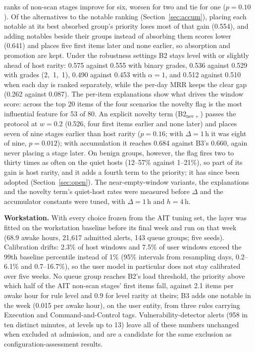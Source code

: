 \documentclass[conference]{IEEEtran}
\begin{document}
ranks of non-scan stages improve for six, worsen for two and tie for one ($p = 0.10$). Of the alternatives to the notable ranking (Section~\ref{sec:accum}), placing each notable at its best absorbed group's priority loses most of that gain (0.554), and adding notables beside their groups instead of absorbing them scores lower (0.641) and places five first items later and none earlier, so absorption and promotion are kept. Under the robustness settings B2 stays level with or slightly ahead of host rarity: 0.575 against 0.555 with binary grades, 0.536 against 0.529 with grades (2,~1,~1), 0.490 against 0.453 with $\alpha = 1$, and 0.512 against 0.510 when each day is ranked separately, while the per-day MRR keeps the clear gap (0.262 against 0.087). The per-item explanations show what drives the window score: across the top 20 items of the four scenarios the novelty flag is the most influential feature for 53 of 80. An explicit novelty term (B2$_\mathrm{nov+}$) passes the protocol at $w = 0.2$ (0.526, four first items earlier and none later) and places seven of nine stages earlier than host rarity ($p = 0.16$; with $\Delta = 1$\,h it was eight of nine, $p = 0.012$); with accumulation it reaches 0.684 against B3's 0.660, again never placing a stage later. On benign groups, however, the flag fires two to thirty times as often on the quiet hosts (12--57\% against 1--21\%), so part of its gain is host rarity, and it adds a fourth term to the priority; it has since been adopted (Section~\ref{sec:open}). The near-empty-window variants, the explanations and the novelty term's quiet-host rates were measured before $\Delta$ and the accumulator constants were tuned, with $\Delta = 1$\,h and $h = 4$\,h.

\textbf{Workstation.} With every choice frozen from the AIT tuning set, the layer was fitted on the workstation baseline before its final week and run on that week (68.9 awake hours, 21{,}617 admitted alerts, 143 queue groups; five seeds). Calibration drifts: 2.3\% of host windows and 7.5\% of user windows exceed the 99th baseline percentile instead of 1\% (95\% intervals from resampling days, 0.2--6.1\% and 0.7--16.7\%), so the user model in particular does not stay calibrated over five weeks. No queue group reaches B2's load threshold, the priority above which half of the AIT non-scan stages' first items fall, against 2.1 items per awake hour for rule level and 0.9 for level rarity at theirs; B3 adds one notable in the week (0.015 per awake hour), on the user entity, from three rules carrying Execution and Command-and-Control tags. Vulnerability-detector alerts (958 in ten distinct minutes, at levels up to 13) leave all of these numbers unchanged when excluded at admission, and are a candidate for the same exclusion as configuration-assessment results.
\end{document}
